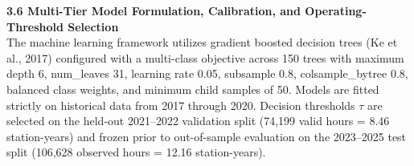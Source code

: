 \documentclass[11pt,a4paper]{article}
\begin{document}
\begin{framed}
\vspace{0.6em}
\noindent\textbf{3.6 Multi-Tier Model Formulation, Calibration, and Operating-Threshold Selection}\\[0.3em]
The machine learning framework utilizes gradient boosted decision trees (Ke et al., 2017) configured with a multi-class objective across 150 trees with maximum depth 6, num\_leaves 31, learning rate 0.05, subsample 0.8, colsample\_bytree 0.8, balanced class weights, and minimum child samples of 50. Models are fitted strictly on historical data from 2017 through 2020. Decision thresholds $\tau$ are selected on the held-out 2021--2022 validation split (74,199 valid hours = 8.46 station-years) and frozen prior to out-of-sample evaluation on the 2023--2025 test split (106,628 observed hours = 12.16 station-years).


\end{framed}
\end{document}

